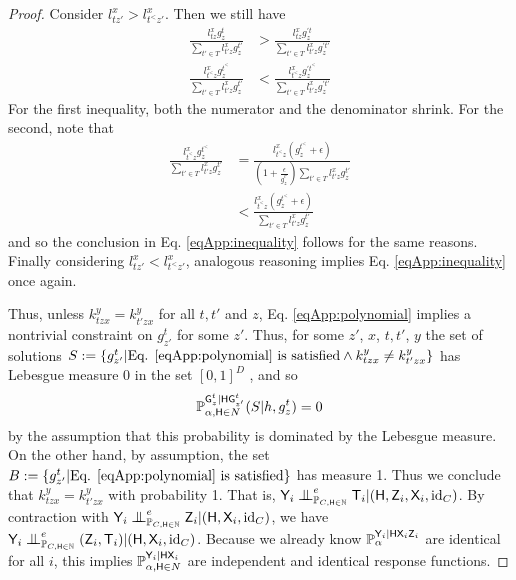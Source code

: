 \begin{proof}
Consider $l^x_{tz'}> l^x_{t^<z'}$. Then we still have
\begin{align}
    \frac{l^x_{tz}g^t_z}{\sum_{t'\in T}l^x_{t'z}g^{t'}_z} &> \frac{l^x_{tz}g^{\prime t}_z}{\sum_{t'\in T}l^x_{t'z}g^{\prime t'}_z}\\
    \frac{l^x_{t^<z}g^{t^<}_z}{\sum_{t'\in T}l^x_{t'z}g^{t'}_z} &< \frac{l^x_{t^<z}g^{\prime t^<}_z}{\sum_{t'\in T}l^x_{t'z}g^{\prime t'}_z}
\end{align}
For the first inequality, both the numerator and the denominator shrink. For the second, note that
\begin{align}
    \frac{l^x_{t^<z}g^{t^<}_z}{\sum_{t'\in T}l^x_{t'z}g^{t'}_z} &= \frac{l^x_{t^<z}(g^{t^<}_z+\epsilon)}{(1+\frac{\epsilon}{g^{t'}_z})\sum_{t'\in T}l^x_{t'z}g^{t'}_z}\\
    &< \frac{l^x_{t^<z}(g^{t^<}_z+\epsilon)}{\sum_{t'\in T}l^x_{t'z}g^{t'}_z}
\end{align}
and so the conclusion in Eq. \eqref{eqApp:inequality} follows for the same reasons. Finally considering $l^x_{tz'}< l^x_{t^<z'}$, analogous reasoning implies Eq. \eqref{eqApp:inequality} once again.

Thus, unless $k^y_{tzx}=k^y_{t'zx}$ for all $t,t'$ and $z$, Eq. \eqref{eqApp:polynomial} implies a nontrivial constraint on  $g^t_{z'}$ for some $z'$. Thus, for some $z'$, $x$, $t,t'$, $y$ the set of solutions $S:=\{g^t_{z'}|\text{Eq. \eqref{eqApp:polynomial} is satisfied}\land k^y_{tzx}\neq k^y_{t'zx}\}$ has Lebesgue measure 0 in the set $[0,1]^{D}$ \citep{okamoto_distinctness_1973}, and so
\begin{align}
    \mathbb{P}_{\alpha,\mathsf{H}\in N}^{\mathsf{G}^t_{z}|\mathsf{H}\mathsf{G}^t_{z'}}(S|h,g^t_{z}) = 0
\end{align}
by the assumption that this probability is dominated by the Lebesgue measure. On the other hand, by assumption, the set $B:=\{g^t_{z'}|\text{Eq. \eqref{eqApp:polynomial} is satisfied}\}$ has measure 1. Thus we conclude that $k^y_{tzx}=k^y_{t'zx}$ with probability 1. That is, $\RV{Y}_i\CI_{\prob{P}_{C,\RV{H}\in\mathbb{N}}}^e \RV{T}_i|(\RV{H},\RV{Z}_i,\RV{X}_i,\text{id}_C)$. By contraction with $\RV{Y}_i\CI^e_{\prob{P}_{C,\RV{H}\in\mathbb{N}}} \RV{Z}_i|(\RV{H},\RV{X}_i,\text{id}_C)$, we have $\RV{Y}_i\CI^e_{\prob{P}_{C,\RV{H}\in\mathbb{N}}} (\RV{Z}_i,\RV{T}_i)|(\RV{H},\RV{X}_i,\text{id}_C)$. Because we already know $\mathbb{P}_\alpha^{\mathsf{Y}_i|\mathsf{H}\mathsf{X}_i\mathsf{Z}_i}$ are identical for all $i$, this implies $\mathbb{P}_{\alpha,\mathsf{H}\in N}^{\mathsf{Y}_i|\mathsf{H}\mathsf{X}_i}$ are independent and identical response functions.
\end{proof}


